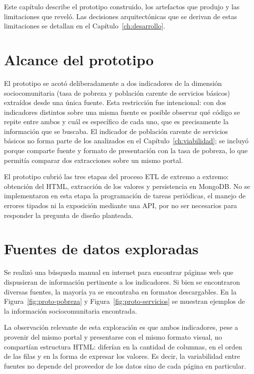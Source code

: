 \documentclass[12pt,letterpaper,oneside]{report}
\begin{document}
Este cap\'itulo describe el prototipo construido, los artefactos que produjo y las limitaciones que revel\'o. Las decisiones arquitect\'onicas que se derivan de estas limitaciones se detallan en el Cap\'itulo~\ref{ch:desarrollo}.

\section{Alcance del prototipo}
\label{sec:alcance-prototipo}

El prototipo se acot\'o deliberadamente a dos indicadores de la dimensi\'on sociocomunitaria (tasa de pobreza y poblaci\'on carente de servicios b\'asicos) extra\'idos desde una \'unica fuente. Esta restricci\'on fue intencional: con dos indicadores distintos sobre una misma fuente es posible observar qu\'e c\'odigo se repite entre ambos y cu\'al es espec\'ifico de cada uno, que es precisamente la informaci\'on que se buscaba. El indicador de poblaci\'on carente de servicios b\'asicos no forma parte de los analizados en el Cap\'itulo~\ref{ch:viabilidad}; se incluy\'o porque comparte fuente y formato de presentaci\'on con la tasa de pobreza, lo que permit\'ia comparar dos extracciones sobre un mismo portal.

El prototipo cubri\'o las tres etapas del proceso ETL de extremo a extremo: obtenci\'on del HTML, extracci\'on de los valores y persistencia en MongoDB. No se implementaron en esta etapa la programaci\'on de tareas peri\'odicas, el manejo de errores tipados ni la exposici\'on mediante una API, por no ser necesarios para responder la pregunta de dise\~no planteada.

\section{Fuentes de datos exploradas}
\label{sec:fuentes-exploradas}

Se realiz\'o una b\'usqueda manual en internet para encontrar p\'aginas web que dispusieran de informaci\'on pertinente a los indicadores. Si bien se encontraron diversas fuentes, la mayor\'ia ya se encontraba en formatos descargables. En la Figura~\ref{fig:proto-pobreza} y Figura~\ref{fig:proto-servicios} se muestran ejemplos de la informaci\'on sociocomunitaria encontrada.

La observaci\'on relevante de esta exploraci\'on es que ambos indicadores, pese a provenir del mismo portal y presentarse con el mismo formato visual, no compart\'ian estructura HTML: difer\'ian en la cantidad de columnas, en el orden de las filas y en la forma de expresar los valores. Es decir, la variabilidad entre fuentes no depende del proveedor de los datos sino de cada p\'agina en particular.
\end{document}
